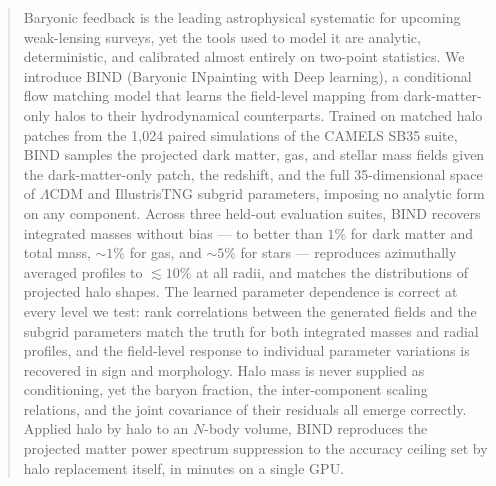 \documentclass[linenumbers,trackchanges, twocolumn]{aastex701}
\begin{document}
\begin{abstract}
Baryonic feedback is the leading astrophysical systematic for upcoming
weak-lensing surveys, yet the tools used to model it are analytic,
deterministic, and calibrated almost entirely on two-point statistics. We
introduce \textsc{BIND} (Baryonic INpainting with Deep learning), a conditional
flow matching model that learns the field-level mapping from dark-matter-only
halos to their hydrodynamical counterparts. Trained on matched halo patches
from the 1{,}024 paired simulations of the CAMELS SB35 suite, \textsc{BIND}
samples the projected dark matter, gas, and stellar mass fields given the
dark-matter-only patch, the redshift, and the full 35-dimensional space of
$\Lambda$CDM and IllustrisTNG subgrid parameters, imposing no analytic form on
any component. Across three held-out evaluation
suites, \textsc{BIND} recovers integrated masses without bias --- to better
than $1\%$ for dark matter and total mass, ${\sim}1\%$ for gas, and ${\sim}5\%$
for stars --- reproduces azimuthally averaged profiles to $\lesssim10\%$ at all
radii, and matches the distributions of projected halo shapes. The learned
parameter dependence is correct at every level we test: rank correlations
between the generated fields and the subgrid parameters match the truth for
both integrated masses and radial profiles, and the field-level response to
individual parameter variations is recovered in sign and morphology. Halo mass is never supplied as conditioning, yet the
baryon fraction, the inter-component scaling relations, and the joint
covariance of their residuals all emerge correctly. Applied halo by halo to an
$N$-body volume, \textsc{BIND} reproduces the projected matter power spectrum
suppression to the accuracy ceiling set by halo replacement itself, in minutes
on a single GPU.
\end{abstract}

\end{document}
